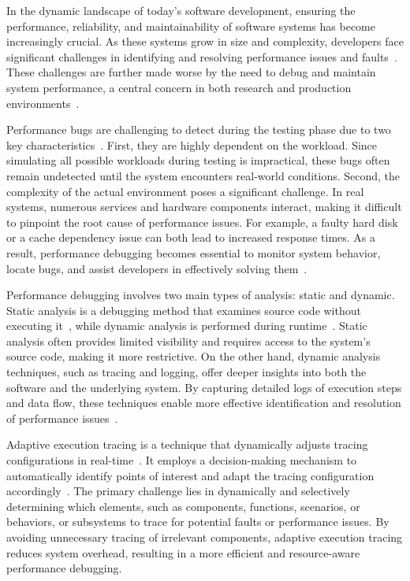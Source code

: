 \documentclass[pdflatex,sn-nature]{sn-jnl}%
\theoremstyle{thmstyleone}%
\theoremstyle{thmstyletwo}%
\theoremstyle{thmstylethree}%
\begin{document}
In the dynamic landscape of today's software development, ensuring the performance, reliability, and maintainability of software systems has become increasingly crucial. As these systems grow in size and complexity, developers face significant challenges in identifying and resolving performance issues and faults~\cite{ayewah2008using,ball1999concept}. These challenges are further made worse by the need to debug and maintain system performance, a central concern in both research and production environments~\cite{sturmann2020using}. 

Performance bugs are challenging to detect during the testing phase due to two key characteristics~\cite{zhang2020diagnostic}. First, they are highly dependent on the workload. Since simulating all possible workloads during testing is impractical, these bugs often remain undetected until the system encounters real-world conditions. Second, the complexity of the actual environment poses a significant challenge. In real systems, numerous services and hardware components interact, making it difficult to pinpoint the root cause of performance issues. For example, a faulty hard disk or a cache dependency issue can both lead to increased response times. As a result, performance debugging becomes essential to monitor system behavior, locate bugs, and assist developers in effectively solving them~\cite{ates2019automated}.

Performance debugging involves two main types of analysis: static and dynamic. Static analysis is a debugging method that examines source code without executing it~\cite{ayewah2008using}, while dynamic analysis is performed during runtime~\cite{ball1999concept}. Static analysis often provides limited visibility and requires access to the system's source code, making it more restrictive. On the other hand, dynamic analysis techniques, such as tracing and logging, offer deeper insights into both the software and the underlying system. By capturing detailed logs of execution steps and data flow, these techniques enable more effective identification and resolution of performance issues~\cite{parker-2020}.

Adaptive execution tracing is a technique that dynamically adjusts tracing configurations in real-time~\cite{peiris2012adapting,parker-2020}. It employs a decision-making mechanism to automatically identify points of interest and adapt the tracing configuration accordingly~\cite{ates2019automated}. The primary challenge lies in dynamically and selectively determining which elements, such as components, functions, scenarios, or behaviors, or subsystems to trace for potential faults or performance issues. By avoiding unnecessary tracing of irrelevant components, adaptive execution tracing reduces system overhead, resulting in a more efficient and resource-aware performance debugging.
\end{document}
